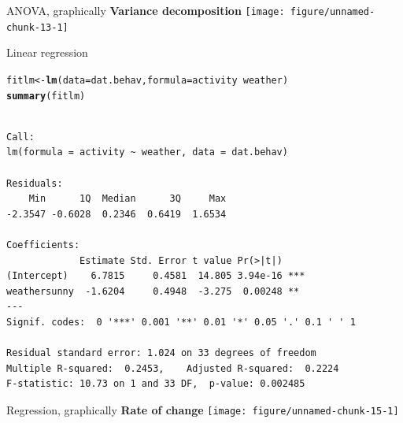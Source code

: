 \documentclass[10pt]{beamer}\usepackage[]{graphicx}\usepackage[]{color}
\makeatletter
\newcommand{\hlopt}[1]{\textcolor[rgb]{0,0,0}{#1}}%
\newcommand{\hlstd}[1]{\textcolor[rgb]{0.345,0.345,0.345}{#1}}%
\newcommand{\hlkwb}[1]{\textcolor[rgb]{0.69,0.353,0.396}{#1}}%
\newcommand{\hlkwc}[1]{\textcolor[rgb]{0.333,0.667,0.333}{#1}}%
\newcommand{\hlkwd}[1]{\textcolor[rgb]{0.737,0.353,0.396}{\textbf{#1}}}%
\newenvironment{kframe}{%
 \def\at@end@of@kframe{}%
 \ifinner\ifhmode%
  \def\at@end@of@kframe{\end{minipage}}%
  \begin{minipage}{\columnwidth}%
 \fi\fi%
 \def\FrameCommand##1{\hskip\@totalleftmargin \hskip-\fboxsep
 \colorbox{shadecolor}{##1}\hskip-\fboxsep
     \hskip-\linewidth \hskip-\@totalleftmargin \hskip\columnwidth}%
 \MakeFramed {\advance\hsize-\width
   \@totalleftmargin\z@ \linewidth\hsize
   \@setminipage}}%
 {\par\unskip\endMakeFramed%
 \at@end@of@kframe}
\newenvironment{knitrout}{}{} %
\makeatother
\begin{document}
\begin{frame}[fragile]{ANOVA, graphically}
\textbf{Variance decomposition}
\centering
\begin{knitrout}
\color{fgcolor}
\texttt{[image: figure/unnamed-chunk-13-1]} 

\end{knitrout}
\end{frame}

\begin{frame}[fragile]{Linear regression}

\begin{knitrout}
\color{fgcolor}\begin{kframe}
\begin{alltt}
\hlstd{fitlm} \hlkwb{<-} \hlkwd{lm}\hlstd{(}\hlkwc{data} \hlstd{= dat.behav,} \hlkwc{formula} \hlstd{= activity} \hlopt{~} \hlstd{weather)}
\hlkwd{summary}\hlstd{(fitlm)}
\end{alltt}
\begin{verbatim}

Call:
lm(formula = activity ~ weather, data = dat.behav)

Residuals:
    Min      1Q  Median      3Q     Max 
-2.3547 -0.6028  0.2346  0.6419  1.6534 

Coefficients:
             Estimate Std. Error t value Pr(>|t|)    
(Intercept)    6.7815     0.4581  14.805 3.94e-16 ***
weathersunny  -1.6204     0.4948  -3.275  0.00248 ** 
---
Signif. codes:  0 '***' 0.001 '**' 0.01 '*' 0.05 '.' 0.1 ' ' 1

Residual standard error: 1.024 on 33 degrees of freedom
Multiple R-squared:  0.2453,	Adjusted R-squared:  0.2224 
F-statistic: 10.73 on 1 and 33 DF,  p-value: 0.002485
\end{verbatim}
\end{kframe}
\end{knitrout}
\end{frame}

\begin{frame}[fragile]{Regression, graphically}
\textbf{Rate of change}
\centering
\begin{knitrout}
\color{fgcolor}
\texttt{[image: figure/unnamed-chunk-15-1]} 

\end{knitrout}
\end{frame}
\end{document}
